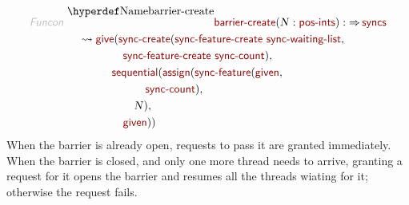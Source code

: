 \begin{align*}
  \KEY{Funcon} ~ 
  & \NAMEDECL{barrier-create}(\VAR{N} : \NAME{pos-ints}) :  \TO \NAME{syncs} \\
  & \quad \leadsto \NAME{give}
                     ( \NAME{sync-create}
                         ( \NAME{sync-feature-create} ~
                             \NAME{sync-waiting-list}, \\&\quad \quad \quad \quad \quad 
                           \NAME{sync-feature-create} ~
                             \NAME{sync-count} ), \\&\quad \quad \quad \quad 
                       \NAME{sequential}
                         ( \NAME{assign}
                             ( \NAME{sync-feature}
                                 ( \NAME{given}, \\&\quad \quad \quad \quad \quad \quad \quad 
                                   \NAME{sync-count} ), \\&\quad \quad \quad \quad \quad \quad 
                               \VAR{N} ), \\&\quad \quad \quad \quad \quad 
                           \NAME{given} ) )
\end{align*}
When the barrier is already open, requests to pass it are granted immediately.
When the barrier is closed, and only one more thread needs to arrive, granting
a request for it opens the barrier and resumes all the threads wiating for it;
otherwise the request fails.

